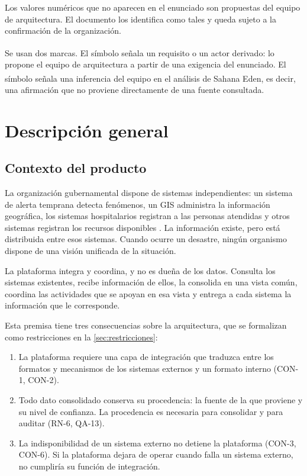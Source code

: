 \documentclass[11pt,letterpaper]{article}
\newcommand{\derivado}{\textsuperscript{\textdagger}}
\newcommand{\inferencia}{\textsuperscript{\textasteriskcentered}}
\begin{document}
Los valores numéricos que no aparecen en el enunciado son propuestas del equipo de arquitectura.
El documento los identifica como tales y queda sujeto a la confirmación de la organización.

Se usan dos marcas. El símbolo \derivado{} señala un requisito o un actor derivado: lo propone el
equipo de arquitectura a partir de una exigencia del enunciado. El símbolo \inferencia{} señala una
inferencia del equipo en el análisis de Sahana Eden, es decir, una afirmación que no proviene
directamente de una fuente consultada.

\newpage
\section{Descripción general}
\label{sec:descripcion}

\subsection{Contexto del producto}

La organización gubernamental dispone de sistemas independientes: un sistema de alerta temprana
detecta fenómenos, un GIS administra la información geográfica, los sistemas hospitalarios registran
a las personas atendidas y otros sistemas registran los recursos disponibles \cite{enunciado}. La
información existe, pero está distribuida entre esos sistemas. Cuando ocurre un desastre, ningún
organismo dispone de una visión unificada de la situación.

La plataforma integra y coordina, y no es dueña de los datos. Consulta los sistemas existentes,
recibe información de ellos, la consolida en una vista común, coordina las actividades que se apoyan
en esa vista y entrega a cada sistema la información que le corresponde.

Esta premisa tiene tres consecuencias sobre la arquitectura, que se formalizan como restricciones en
la \cref{sec:restricciones}:

\begin{enumerate}
  \item La plataforma requiere una capa de integración que traduzca entre los formatos y mecanismos
        de los sistemas externos y un formato interno (CON-1, CON-2).
  \item Todo dato consolidado conserva su procedencia: la fuente de la que proviene y su nivel de
        confianza. La procedencia es necesaria para consolidar y para auditar (RN-6, QA-13).
  \item La indisponibilidad de un sistema externo no detiene la plataforma (CON-3, CON-6). Si la
        plataforma dejara de operar cuando falla un sistema externo, no cumpliría su función de
        integración.
\end{enumerate}
\end{document}
